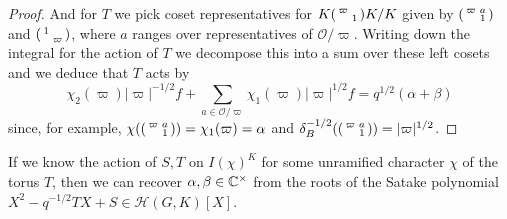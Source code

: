 \begin{proof}
    And for $T$ we pick coset representatives for $K\begin{psmallmatrix}\varpi & \\ & 1\end{psmallmatrix}K/K$ given by $\begin{psmallmatrix}\varpi &a \\ & 1\end{psmallmatrix}$ and $\begin{psmallmatrix}1 & \\ & \varpi\end{psmallmatrix}$, where $a$ ranges over representatives of $\mathcal O/\varpi$. Writing down the integral for the action of $T$ we decompose this into a sum over these left cosets and we deduce that $T$ acts by
    $$\chi_2(\varpi)|\varpi|^{-1/2}f + \sum\limits_{a \in \mathcal O/\varpi} \chi_1(\varpi)|\varpi|^{1/2}f = q^{1/2}(\alpha+\beta)$$
    since, for example, $\chi(\begin{psmallmatrix}\varpi & a\\ & 1\end{psmallmatrix})=\chi_1(\varpi)=\alpha$ and $\delta_B^{-1/2}(\begin{psmallmatrix}\varpi & a\\ & 1\end{psmallmatrix}) = |\varpi|^{1/2}$.
\end{proof}
\begin{rem}
    If we know the action of $S,T$ on $I(\chi)^K$ for some unramified character $\chi$ of the torus $T$, then we can recover $\alpha,\beta \in \mathbb{C}^\times$ from the roots of the Satake polynomial $X^2-q^{-1/2}TX+S \in \mathcal H(G,K)[X]$.
\end{rem}
